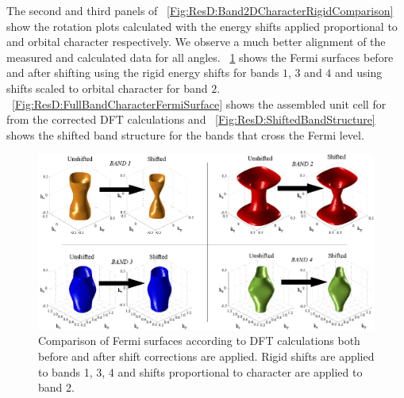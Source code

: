 The second and third panels of \fig~\ref{Fig:ResD:Band2DCharacterRigidComparison} show the rotation plots calculated with the energy shifts applied proportional to \DzTwo and \DxzDyz orbital character respectively. We observe a much better alignment of the measured and calculated data for all angles. \Fig~\ref{Fig:ResD:BandCharacterFSShiftComparison} shows the Fermi surfaces before and after shifting using the rigid energy shifts for bands $1$, $3$ and $4$ and using shifts scaled to \DzTwo orbital character for band $2$. \Fig~\ref{Fig:ResD:FullBandCharacterFermiSurface} shows the assembled unit cell for \BaFeP from the corrected DFT calculations and \fig~\ref{Fig:ResD:ShiftedBandStructure} shows the shifted band structure for the bands that cross the Fermi level.
\begin{figure}[htbp]
    \begin{center}
        \includegraphics[scale=0.7]{Chapter-dHvABaFe2P2/Figures/AngleDepMeasurements/BandCharacterFermiSurface/BandCharacterFermiSurfaceShiftComparison}
        \caption{Comparison of Fermi surfaces according to DFT calculations both before and after shift corrections are applied. Rigid shifts are applied to bands 1, 3, 4 and shifts proportional to \DzTwo character are applied to band 2.}
        \label{Fig:ResD:BandCharacterFSShiftComparison}
    \end{center}
\end{figure}
